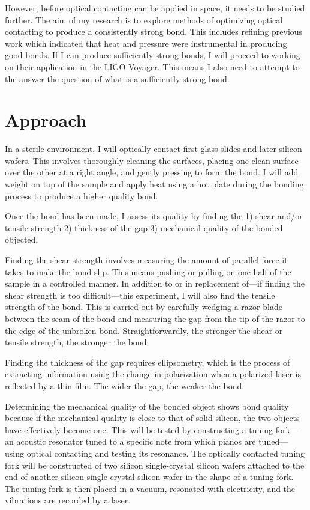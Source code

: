 \documentclass[colorlinks=true,pdfstartview=FitV,linkcolor=blue,
            citecolor=red,urlcolor=magenta]{ligodoc}
\begin{document}
However, before optical contacting can be applied in space, it needs to be studied further. The aim of my research is to explore methods of optimizing optical contacting to produce a consistently strong bond. This includes refining previous work which indicated that heat and pressure were instrumental in producing good bonds. If I can produce sufficiently strong bonds, I will proceed to working on their application in the LIGO Voyager. This means I also need to attempt to the answer the question of what is a sufficiently strong bond.

\section{Approach}
In a sterile environment, I will optically contact first glass slides and later silicon wafers. This involves thoroughly cleaning the surfaces, placing one clean surface over the other at a right angle, and gently pressing to form the bond. I will add weight on top of the sample and apply heat using a hot plate during the bonding process to produce a higher quality bond.

Once the bond has been made, I assess its quality by finding the 1) shear and/or tensile strength 2) thickness of the gap 3) mechanical quality of the bonded objected.

Finding the shear strength involves measuring the amount of parallel force it takes to make the bond slip. This means pushing or pulling on one half of the sample in a controlled manner. In addition to or in replacement of---if finding the shear strength is too difficult---this experiment, I will also find the tensile strength of the bond. This is carried out by carefully wedging a razor blade between the seam of the bond and measuring the gap from the tip of the razor to the edge of the unbroken bond. Straightforwardly, the stronger the shear or tensile strength, the stronger the bond.

Finding the thickness of the gap requires ellipsometry, which is the process of extracting information using the change in polarization when a polarized laser is reflected by a thin film. The wider the gap, the weaker the bond.

Determining the mechanical quality of the bonded object shows bond quality because if the mechanical quality is close to that of solid silicon, the two objects have effectively become one. This will be tested by constructing a tuning fork---an acoustic resonator tuned to a specific note from which pianos are tuned---using optical contacting and testing its resonance. The optically contacted tuning fork will be constructed of two silicon single-crystal silicon wafers attached to the end of another silicon single-crystal silicon wafer in the shape of a tuning fork. The tuning fork is then placed in a vacuum, resonated with electricity, and the vibrations are recorded by a laser.
\end{document}
